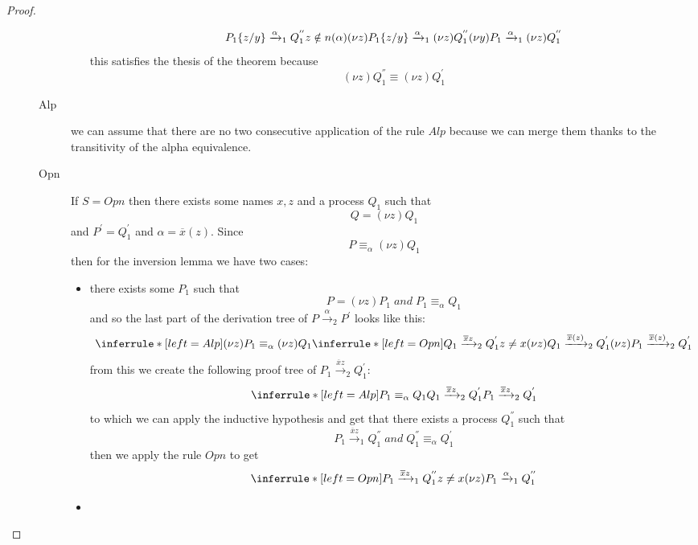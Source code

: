 \begin{theorem}
\begin{proof}
\begin{description}
\begin{description}
\begin{itemize}
\[{{			  P_{1}\{z/y\} \xrightarrow{\alpha}_{1}Q_{1}^{''}
			\\
			  z\notin n(\alpha)
		      }{
			(\nu z)P_{1}\{z/y\} \xrightarrow{\alpha}_{1}(\nu z)Q_{1}^{''}
		      }		 
		  }{
		    (\nu y)P_{1} \xrightarrow{\alpha}_{1}(\nu z)Q_{1}^{''}
		  }
		\]
		this satisfies the thesis of the theorem because  
		\[
		  (\nu z)Q_{1}^{''}\equiv(\nu z)Q_{1}^{'}
		\]
	    \end{itemize}
	  \item[Alp]
	    we can assume that there are no two consecutive application of the rule $Alp$ because we can merge them thanks to the transitivity of the alpha equivalence.
	  \item[Opn]
	    If $S=Opn$ then there exists some names $x,z$ and a process $Q_{1}$ such that 
	    \[
	      Q=(\nu z)Q_{1}
	    \]
	    and $P^{'}=Q_{1}^{'}$ and $\alpha=\overline{x}(z)$. Since 
	    \[
	      P\equiv_{\alpha}(\nu z)Q_{1}
	    \]
	    then for the inversion lemma we have two cases:
	    \begin{itemize}
	      \item 
		there exists some $P_{1}$ such that 
		\[
		  P=(\nu z)P_{1}\; and\; P_{1}\equiv_{\alpha}Q_{1}
		\]
		and so the last part of the derivation tree of $P\xrightarrow{\alpha}_{2}P^{'}$ looks like this:
		\[
		  \inferrule* [left=Alp]{
		      (\nu z)P_{1}\equiv_{\alpha}(\nu z)Q_{1}
		    \\
		      \inferrule* [left=Opn]{
			  Q_{1}\xrightarrow{\overline{x}z}_{2}Q_{1}^{'}
			\\
			  z\neq x
		      }{
			(\nu z)Q_{1}\xrightarrow{\overline{x}(z)}_{2}Q_{1}^{'}
		      }
		  }{
		    (\nu z)P_{1}\xrightarrow{\overline{x}(z)}_{2}Q_{1}^{'}
		  }
		\]
		from this we create the following proof tree of $P_{1}\xrightarrow{\overline{x}z}_{2}Q_{1}^{'}$:
		\[
		  \inferrule* [left=Alp]{
		      P_{1}\equiv_{\alpha}Q_{1}
		    \\
		      Q_{1}\xrightarrow{\overline{x}z}_{2}Q_{1}^{'}
		  }{
		    P_{1}\xrightarrow{\overline{x}z}_{2}Q_{1}^{'}
		  }		
		\]
		to which we can apply the inductive hypothesis and get that there exists a process $Q_{1}^{''}$ such that
		\[
		  P_{1}\xrightarrow{\overline{x}z}_{1}Q_{1}^{''}\;and\; Q_{1}^{''}\equiv_{\alpha}Q_{1}^{'}
		\]
		then we apply the rule $Opn$ to get
		\[
		      \inferrule* [left=Opn]{
			  P_{1}\xrightarrow{\overline{x}z}_{1}Q_{1}^{''}
			\\
			  z\neq x
		      }{
			(\nu z)P_{1}\xrightarrow{\alpha}_{1}Q_{1}^{''}
		      }		 
		\]
	      \item

\end{itemize}
\end{description}
\end{description}
\end{proof}
\end{theorem}
